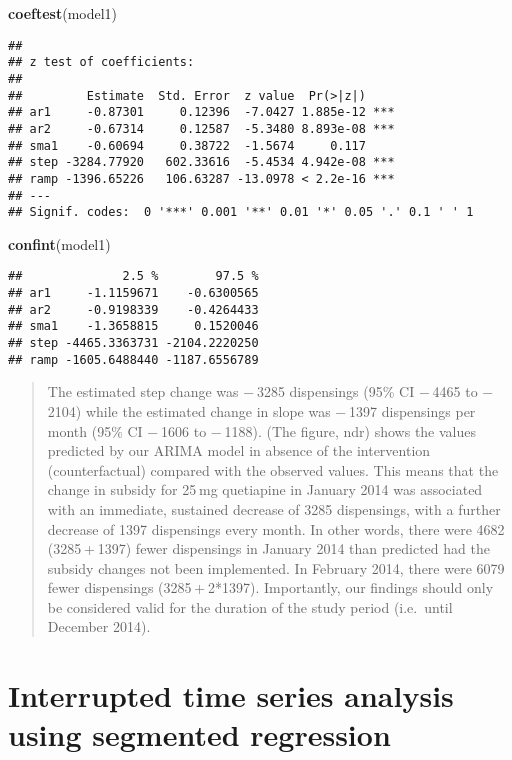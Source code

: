 \documentclass[
]{article}
\newenvironment{Shaded}{\begin{snugshade}}{\end{snugshade}}
\newcommand{\FunctionTok}[1]{\textcolor[rgb]{0.13,0.29,0.53}{\textbf{#1}}}
\newcommand{\NormalTok}[1]{#1}
\begin{document}
\begin{Shaded}
\begin{Highlighting}[]
\FunctionTok{coeftest}\NormalTok{(model1)}
\end{Highlighting}
\end{Shaded}

\begin{verbatim}
## 
## z test of coefficients:
## 
##         Estimate  Std. Error  z value  Pr(>|z|)    
## ar1     -0.87301     0.12396  -7.0427 1.885e-12 ***
## ar2     -0.67314     0.12587  -5.3480 8.893e-08 ***
## sma1    -0.60694     0.38722  -1.5674     0.117    
## step -3284.77920   602.33616  -5.4534 4.942e-08 ***
## ramp -1396.65226   106.63287 -13.0978 < 2.2e-16 ***
## ---
## Signif. codes:  0 '***' 0.001 '**' 0.01 '*' 0.05 '.' 0.1 ' ' 1
\end{verbatim}

\begin{Shaded}
\begin{Highlighting}[]
\FunctionTok{confint}\NormalTok{(model1)}
\end{Highlighting}
\end{Shaded}

\begin{verbatim}
##              2.5 %        97.5 %
## ar1     -1.1159671    -0.6300565
## ar2     -0.9198339    -0.4264433
## sma1    -1.3658815     0.1520046
## step -4465.3363731 -2104.2220250
## ramp -1605.6488440 -1187.6556789
\end{verbatim}

\begin{quote}
The estimated step change was − 3285 dispensings (95\% CI − 4465 to − 2104) while the estimated change in slope was − 1397 dispensings per month (95\% CI − 1606 to − 1188). (The figure, ndr) shows the values predicted by our ARIMA model in absence of the intervention (counterfactual) compared with the observed values. This means that the change in subsidy for 25 mg quetiapine in January 2014 was associated with an immediate, sustained decrease of 3285 dispensings, with a further decrease of 1397 dispensings every month. In other words, there were 4682 (3285 + 1397) fewer dispensings in January 2014 than predicted had the subsidy changes not been implemented. In February 2014, there were 6079 fewer dispensings (3285 + 2*1397). Importantly, our findings should only be considered valid for the duration of the study period (i.e.~until December 2014).
\end{quote}

\section{Interrupted time series analysis using segmented regression}\label{interrupted-time-series-analysis-using-segmented-regression}
\end{document}
